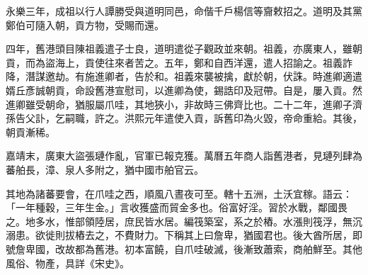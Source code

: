 \begin{pinyinscope}
永樂三年，成祖以行人譚勝受與道明同邑，命偕千戶楊信等齎敕招之。道明及其黨鄭伯可隨入朝，貢方物，受賜而還。

四年，舊港頭目陳祖義遣子士良，道明遣從子觀政並來朝。祖義，亦廣東人，雖朝貢，而為盜海上，貢使往來者苦之。五年，鄭和自西洋還，遣人招諭之。祖義詐降，潛謀邀劫。有施進卿者，告於和。祖義來襲被擒，獻於朝，伏誅。時進卿適遣婿丘彥誠朝貢，命設舊港宣慰司，以進卿為使，錫誥印及冠帶。自是，屢入貢。然進卿雖受朝命，猶服屬爪哇，其地狹小，非故時三佛齊比也。二十二年，進卿子濟孫告父訃，乞嗣職，許之。洪熙元年遣使入貢，訴舊印為火毀，帝命重給。其後，朝貢漸稀。

嘉靖末，廣東大盜張璉作亂，官軍已報克獲。萬曆五年商人詣舊港者，見璉列肆為蕃舶長，漳、泉人多附之，猶中國市舶官云。

其地為諸蕃要會，在爪哇之西，順風八晝夜可至。轄十五洲，土沃宜稼。語云：「一年種穀，三年生金。」言收獲盛而貿金多也。俗富好淫。習於水戰，鄰國畏之。地多水，惟部領陸居，庶民皆水居。編筏築室，系之於樁。水漲則筏浮，無沉溺患。欲徙則拔樁去之，不費財力。下稱其上曰詹卑，猶國君也。後大酋所居，即號詹卑國，改故都為舊港。初本富饒，自爪哇破滅，後漸致蕭索，商舶鮮至。其他風俗、物產，具詳《宋史》。


\end{pinyinscope}